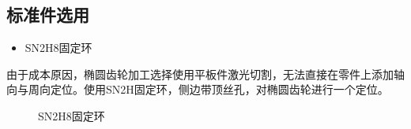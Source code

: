 \documentclass[12pt]{article}
\begin{document}
\begin{CJK}{UTF8}{song}
\subsection{标准件选用}
\begin{itemize}
\item SN2H8固定环
\end{itemize}
由于成本原因，椭圆齿轮加工选择使用平板件激光切割，无法直接在零件上添加轴向与周向定位。使用SN2H固定环，侧边带顶丝孔，对椭圆齿轮进行一个定位。
\begin{figure}[H]
{}
\quad
{}
\caption{SN2H8固定环}
\end{figure}


\end{CJK}
\end{document}
